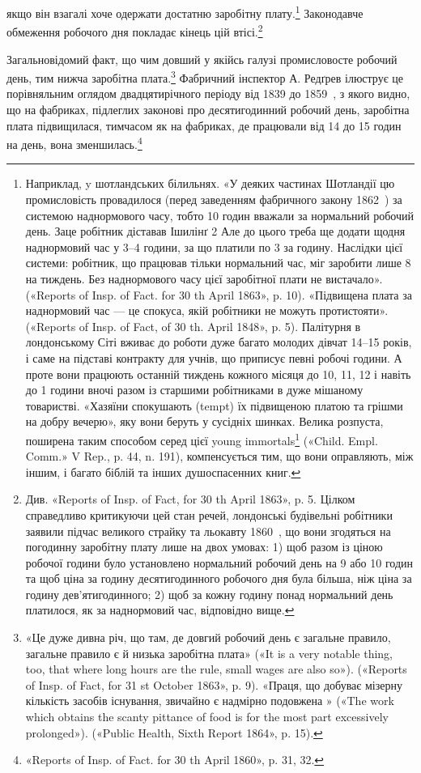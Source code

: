 якщо він взагалі хоче одержати достатню заробітну плату.\footnote{
Наприклад, y шотландських білильнях. «У деяких частинах
Шотландії цю промисловість провадилося (перед заведенням фабричного
закону 1862~) за системою наднормового часу, тобто 10 годин вважали
за нормальний робочий день. Заце робітник діставав Ішилінґ 2
Але до цього треба ще додати щодня наднормовий час у 3--4 години,
за що платили по 3 за годину. Наслідки цієї системи: робітник,
що працював тільки нормальний час, міг заробити лише 8 на
тиждень. Без наднормового часу цієї заробітної плати не вистачало».
(«Reports of Insp. of Fact. for 30 th April 1863», p. 10). «Підвищена плата
за наднормовий час — це спокуса, якій робітники не можуть протистояти».
(«Reports of Insp. of Fact, of 30 th. April 1848», p. 5). Палітурня
в лондонському Сіті вживає до роботи дуже багато молодих дівчат
14--15 років, і саме на підставі контракту для учнів, що приписує певні
робочі години. А проте вони працюють останній тиждень кожного місяця
до 10, 11, 12 і навіть до 1 години вночі разом із старшими робітниками
в дуже мішаному товаристві. «Хазяїни спокушають (tempt) їх підвищеною
платою та грішми на добру вечерю», яку вони беруть у сусідніх
шинках. Велика розпуста, поширена таким способом серед цієї
young immortals\footnote*{
— безсмертної молоді. \emph{Ред.}
} («Child. Empl. Comm.» V Rep., p. 44, n. 191), компенсується
тим, що вони оправляють, між іншим, і багато біблій та інших
душоспасенних книг.
}
Законодавче обмеження робочого дня покладає кінець цій втісі.\footnote{
Див. «Reports of Insp. of Fact, for 30 th April 1863», p. 5. Цілком
справедливо критикуючи цей стан речей, лондонські будівельні робітники
заявили підчас великого страйку та льокавту 1860~, що вони згодяться
на погодинну заробітну плату лише на двох умовах: 1) щоб разом
із ціною робочої години було установлено нормальний робочий день на
9 або 10 годин та щоб ціна за годину десятигодинного робочого дня була
більша, ніж ціна за годину дев’ятигодинного; 2) щоб за кожну годину
понад нормальний день платилося, як за наднормовий час, відповідно вище.
}

Загальновідомий факт, що чим довший у якійсь галузі промисловосте
робочий день, тим нижча заробітна плата.\footnote{
«Це дуже дивна річ, що там, де довгий робочий день є загальне
правило, загальне правило є й низька заробітна плата» («It is a very
notable thing, too, that where long hours are the rule, small wages are also
so»). («Reports of Insp. of Fact, for 31 st October 1863», p. 9). «Праця, що
добуває мізерну кількість засобів існування, звичайно є надмірно подовжена
» («The work which obtains the scanty pittance of food is for the most
part excessively prolonged»). («Public Health, Sixth Report 1864», p. 15).
} Фабричний
інспектор А. Редґрев ілюструє це порівняльним оглядом
двадцятирічного періоду від 1839 до 1859~, з якого видно, що
на фабриках, підлеглих законові про десятигодинний робочий
день, заробітна плата підвищилася, тимчасом як на фабриках,
де працювали від 14 до 15 годин на день, вона зменшилась.\footnote{
«Reports of Insp. of Fact. for 30 th April 1860», p. 31, 32.
}

